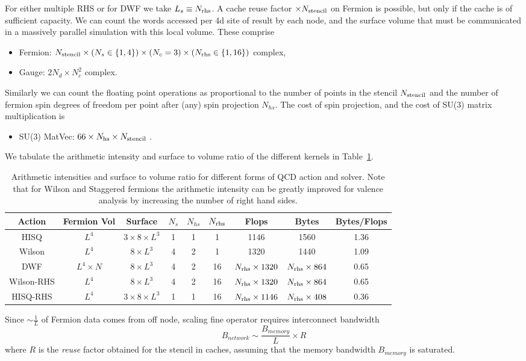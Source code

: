 \documentclass{PoS}
\begin{document}
For either multiple RHS or for DWF we  take $L_s \equiv N_{\rm rhs}$.
A cache reuse factor $\times N_{\rm stencil}$ on Fermion is possible, but only if the cache is of sufficient capacity.
We can count the words accessed per 4d site of result by each node, and the surface volume that must be communicated
in a massively parallel simulation with this local volume. These comprise
\begin{itemize}
\itemsep-0.3em 
\item Fermion: $N_{\rm stencil} \times (N_s \in \{ 1,4 \}) \times (N_c=3) \times (N_{\rm rhs} \in \{ 1, 16 \})$ complex,
\item Gauge: $2 N_d \times N_c^2$ complex.
\end{itemize}
Similarly we can count the floating point operations as proportional to the number of points in the stencil $N_{\rm stencil}$
and the number of fermion spin degrees of freedom per point after (any) spin projection $ N_{hs}$. The
cost of spin projection, and the cost of SU(3) matrix multiplication is
\begin{itemize}
\itemsep-0.3em 
\item  SU(3) MatVec: $66\times N_{\rm hs} \times N_{\rm stencil}$ .
\end{itemize}
We tabulate the arithmetic intensity and surface to volume ratio of the different kernels in Table~\ref{tab:arithint}.
\begin{table}[hbt]
\begin{tabular}{c|cccccccc}
Action  & Fermion Vol & Surface & $N_s$ & $N_{hs}$ & $N_{\rm rhs}$ & Flops & Bytes & Bytes/Flops\\
\hline
HISQ    & $L^4$ & $3\times 8\times L^3$ &  1  & 1 & 1 & 1146 & 1560 & 1.36  \\
Wilson  & $L^4$ & $8\times L^3$ &  4  & 2&  1 & 1320  & 1440 & 1.09      \\
DWF     & $L^4\times N$ & $8\times L^3$ &  4 & 2 & 16 & $N_{\rm rhs}\times 1320$ & $N_{\rm rhs}\times 864$ & 0.65\\
\hline
Wilson-RHS  & $L^4$ & $8\times L^3$ &  4  & 2 & 16 & $N_{\rm rhs} \times 1320$ & $N_{\rm rhs}\times 864$ &0.65 \\
HISQ-RHS    & $L^4$ & $3\times 8\times L^3$ &  1  & 1 & 16 & $N_{\rm rhs}\times 1146$ & $N_{\rm rhs}\times 408$& 0.36\\
\end{tabular}
\caption{\label{tab:arithint}
Arithmetic intensities and surface to volume ratio for different forms of QCD action and solver. Note that for Wilson and 
Staggered fermions the arithmetic intensity can be greatly improved for valence analysis by increasing the number 
of right hand sides. 
}
\end{table}
Since  $\sim \frac{1}{L}$ of Fermion data comes from off node, scaling fine operator requires interconnect bandwidth
$$B_{network} \sim \frac{B_{memory}}{L} \times R $$
where $R$ is the \emph{reuse} factor obtained for the stencil in caches, assuming that the memory bandwidth $B_{memory}$ is saturated.
\end{document}
